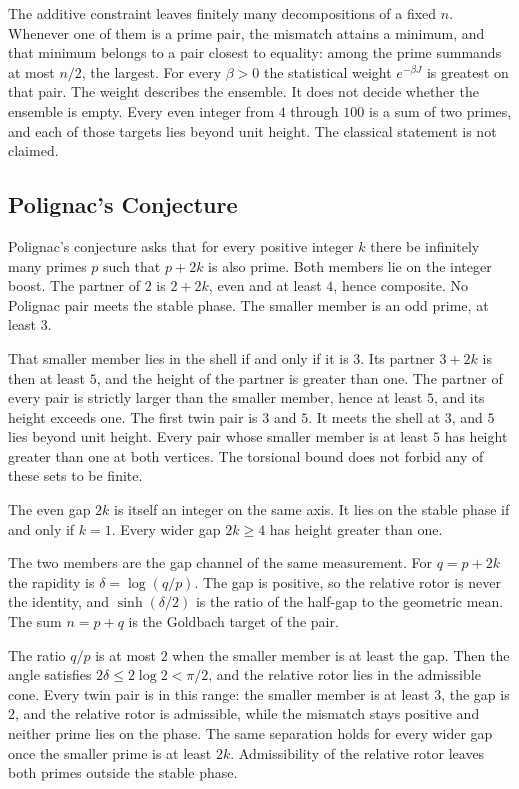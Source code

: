 \documentclass[a4paper]{article}
\theoremstyle{definition}
\theoremstyle{remark}
\begin{document}
The additive constraint leaves finitely many decompositions of a fixed \(n\). Whenever one of them is a prime pair, the mismatch attains a minimum, and that minimum belongs to a pair closest to equality: among the prime summands at most \(n/2\), the largest. For every \(\beta>0\) the statistical weight \(e^{-\beta J}\) is greatest on that pair. The weight describes the ensemble. It does not decide whether the ensemble is empty. Every even integer from \(4\) through \(100\) is a sum of two primes, and each of those targets lies beyond unit height. The classical statement is not claimed.

\subsection{Polignac's Conjecture}

Polignac's conjecture asks that for every positive integer \(k\) there be infinitely many primes \(p\) such that \(p+2k\) is also prime. Both members lie on the integer boost. The partner of \(2\) is \(2+2k\), even and at least \(4\), hence composite. No Polignac pair meets the stable phase. The smaller member is an odd prime, at least \(3\).

That smaller member lies in the shell if and only if it is \(3\). Its partner \(3+2k\) is then at least \(5\), and the height of the partner is greater than one. The partner of every pair is strictly larger than the smaller member, hence at least \(5\), and its height exceeds one. The first twin pair is \(3\) and \(5\). It meets the shell at \(3\), and \(5\) lies beyond unit height. Every pair whose smaller member is at least \(5\) has height greater than one at both vertices. The torsional bound does not forbid any of these sets to be finite.

The even gap \(2k\) is itself an integer on the same axis. It lies on the stable phase if and only if \(k=1\). Every wider gap \(2k\ge 4\) has height greater than one.

The two members are the gap channel of the same measurement. For \(q=p+2k\) the rapidity is \(\delta=\log(q/p)\). The gap is positive, so the relative rotor is never the identity, and \(\sinh(\delta/2)\) is the ratio of the half-gap to the geometric mean. The sum \(n=p+q\) is the Goldbach target of the pair.

The ratio \(q/p\) is at most \(2\) when the smaller member is at least the gap. Then the angle satisfies \(2\delta\le 2\log 2<\pi/2\), and the relative rotor lies in the admissible cone. Every twin pair is in this range: the smaller member is at least \(3\), the gap is \(2\), and the relative rotor is admissible, while the mismatch stays positive and neither prime lies on the phase. The same separation holds for every wider gap once the smaller prime is at least \(2k\). Admissibility of the relative rotor leaves both primes outside the stable phase.
\end{document}
